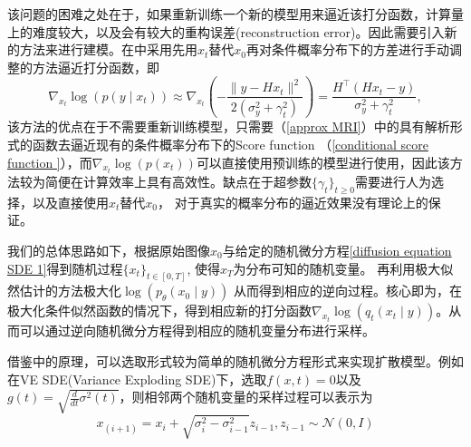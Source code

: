 该问题的困难之处在于，如果重新训练一个新的模型用来逼近该打分函数，计算量上的难度较大，以及会有较大的重构误差(reconstruction error)。因此需要引入新的方法来进行建模。在\cite{song_2}中采用先用$x_t$替代$x_0$再对条件概率分布下的方差进行手动调整的方法逼近打分函数，即
\begin{equation}
    \nabla_{x_t}\log\left(p(y\mid x_t)\right) \approx \nabla_{x_t}\left(-\frac{\|y-Hx_t\|^2}{2\left(\sigma_y^2+\gamma_t^2\right)}\right) = \frac{H^{\top}(Hx_t-y)}{\sigma_y^2+\gamma_t^2},
    \label{approx MRI}
\end{equation}
该方法的优点在于不需要重新训练模型，只需要（\ref{approx MRI}）中的具有解析形式的函数去逼近现有的条件概率分布下的Score function （\ref{conditional score function }），而$\nabla_{x_t}\log\left(p(x_t)\right)$可以直接使用预训练的模型进行使用，因此该方法较为简便在计算效率上具有高效性。缺点在于超参数$\{\gamma_t\}_{t\geq 0}$需要进行人为选择，以及直接使用$x_t$替代$x_0$， 对于真实的概率分布的逼近效果没有理论上的保证。



我们的总体思路如下，根据原始图像$x_0$与给定的随机微分方程\ref{diffusion equation SDE 1}得到随机过程$\{x_t\}_{t\in [0,T]}$, 使得$x_T$为分布可知的随机变量。 再利用极大似然估计的方法极大化$\log\left(p_{\theta}(x_0\mid y)\right)$ 从而得到相应的逆向过程。核心即为，在极大化条件似然函数的情况下，得到相应新的打分函数$\nabla_{x_t}\log(q_t(x_t\mid y))$。从而可以通过逆向随机微分方程得到相应的随机变量分布进行采样。

借鉴\cite{DDPM}中的原理，可以选取形式较为简单的随机微分方程形式来实现扩散模型。例如在VE SDE(Variance Exploding SDE)下，选取$f(x,t)=0$以及$g(t) = \sqrt{\frac{d}{dt}\sigma^2(t)}$，则相邻两个随机变量的采样过程可以表示为
\begin{equation}
    x_{(i+1)} = x_{i}+\sqrt{\sigma_i^2-\sigma_{i-1}^2}z_{i-1}, z_{i-1}\sim \mathcal{N}(0,I)
\end{equation}


